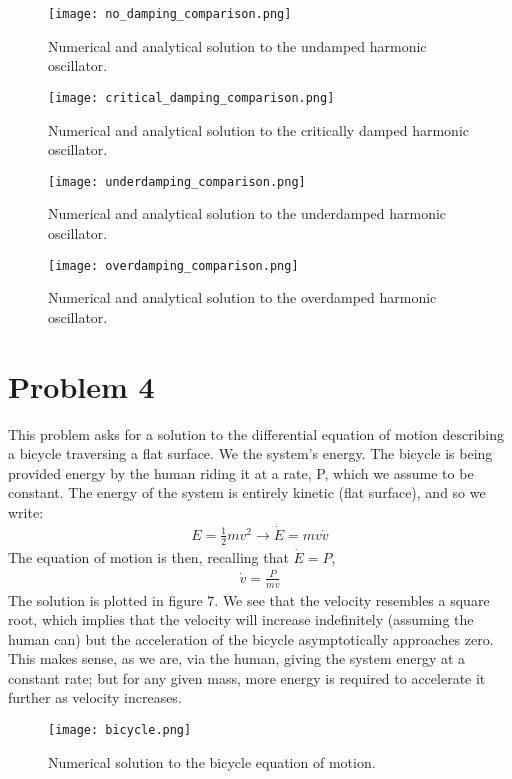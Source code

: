 \documentclass[letter,12pt]{article}
\begin{document}
\begin{figure}[htbp]
    \centering
    \texttt{[image: no\_damping\_comparison.png]}
    \caption{Numerical and analytical solution to the undamped harmonic oscillator.}
\end{figure}

\begin{figure}[htbp]
    \centering
    \texttt{[image: critical\_damping\_comparison.png]}
    \caption{Numerical and analytical solution to the critically damped harmonic oscillator.}
\end{figure}

\begin{figure}[htbp]
    \centering
    \texttt{[image: underdamping\_comparison.png]}
    \caption{Numerical and analytical solution to the underdamped harmonic oscillator.}
\end{figure}

\begin{figure}[htbp]
    \centering
    \texttt{[image: overdamping\_comparison.png]}
    \caption{Numerical and analytical solution to the overdamped harmonic oscillator.}
\end{figure}

\section{Problem 4}

This problem asks for a solution to the differential equation of motion describing a bicycle traversing a flat surface. We the system's energy. The bicycle is being provided energy by the human riding it at a rate, P, which we assume to be constant. The energy of the system is entirely kinetic (flat surface), and so we write:
\begin{align}
E = \frac{1}{2} m v^2 \to \dot{E} = mv\dot{v}
\end{align}
The equation of motion is then, recalling that $\dot{E} = P$,
\begin{align}
\dot{v} = \frac{P}{mv}
\end{align}
The solution is plotted in figure $7$. We see that the velocity resembles a square root, which implies that the velocity will increase indefinitely (assuming the human can) but the acceleration of the bicycle asymptotically approaches zero. This makes sense, as we are, via the human, giving the system energy at a constant rate; but for any given mass, more energy is required to accelerate it further as velocity increases. 

\begin{figure}[htbp]
    \centering
    \texttt{[image: bicycle.png]}
    \caption{Numerical solution to the bicycle equation of motion.}
\end{figure}
\end{document}

